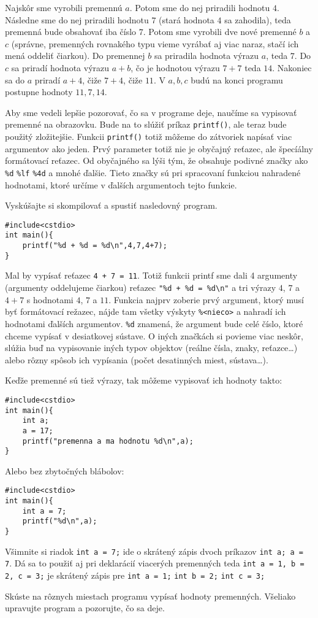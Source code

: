 Najskôr sme vyrobili premennú $a$. Potom sme do nej priradili hodnotu $4$. Následne sme do nej priradili hodnotu $7$ (stará hodnota $4$ sa zahodila), teda premenná bude obsahovať
iba číslo $7$. Potom sme vyrobili dve nové premenné $b$ a $c$ (správne, premenných rovnakého typu vieme vyrábať aj viac naraz, stačí ich mená oddeliť čiarkou).
Do premennej $b$ sa priradila hodnota výrazu $a$, teda $7$. Do $c$ sa priradí hodnota výrazu $a + b$, čo je hodnotou výrazu $7 + 7$ teda $14$. Nakoniec sa do $a$ priradí
$a + 4$, čiže $7+4$, čiže $11$. V $a,b,c$ budú na konci programu postupne hodnoty $11,7,14$.

\medskip

Aby sme vedeli lepšie pozorovať, čo sa v programe deje, naučíme sa vypisovať premenné na obrazovku. Bude na to slúžiť príkaz
\verb!printf()!, ale teraz bude použitý zložitejšie. Funkcii \verb!printf()! totiž môžeme do zátvoriek napísať viac argumentov ako jeden.
Prvý parameter totiž nie je obyčajný reťazec, ale špecíálny formátovací reťazec. Od obyčajného sa lýši tým,
že obsahuje podivné značky ako \verb!%d! \verb!%lf! \verb!%4d! a mnohé ďalšie. Tieto značky sú pri spracovaní funkciou nahradené hodnotami, ktoré určíme v ďalších argumentoch tejto funkcie.

Vyskúšajte si skompilovať a spustiť nasledovný program.
\begin{lstlisting}
#include<cstdio>
int main(){
    printf("%d + %d = %d\n",4,7,4+7);
}
\end{lstlisting}
Mal by vypísať reťazec \verb!4 + 7 = 11!. Totiž funkcii printf sme dali 4 argumenty (argumenty oddelujeme čiarkou) reťazec \verb!"%d + %d = %d\n"! a tri výrazy $4$, $7$ a $4+7$ s hodnotami $4$, $7$ a $11$.
Funkcia najprv zoberie prvý argument, ktorý musí byť formátovací režazec, nájde tam všetky výskyty \verb!%<nieco>! a nahradí ich hodnotami ďalších argumentov.
\verb!%d! znamená, že argument bude celé číslo, ktoré chceme vypísať v desiatkovej sústave. O iných značkách si povieme viac neskôr, slúžia buď na vypisovanie
iných typov objektov (reálne čísla, znaky, reťazce\dots) alebo rôzny spôsob ich vypísania (počet desatinných miest, sústava\dots).

Keďže premenné sú tiež výrazy, tak môžeme vypisovať ich hodnoty takto:
\begin{lstlisting}
#include<cstdio>
int main(){
    int a;
    a = 17;
    printf("premenna a ma hodnotu %d\n",a);
}
\end{lstlisting}
Alebo bez zbytočných blábolov:
\begin{lstlisting}
#include<cstdio>
int main(){
    int a = 7;
    printf("%d\n",a);
}
\end{lstlisting}
Všimnite si riadok \verb!int a = 7;! ide o skrátený zápis dvoch príkazov \verb!int a; a = 7!. Dá sa to použiť aj pri deklarácií viacerých premenných
teda \verb!int a = 1, b = 2, c = 3;! je skrátený zápis pre \verb!int a = 1;! \verb!int b = 2;! \verb!int c = 3;!

 Skúste na rôznych miestach programu vypísať hodnoty premenných. Všeliako upravujte program a pozorujte, čo sa deje.








